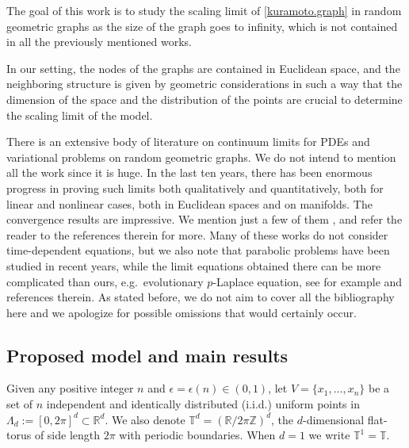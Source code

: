 \documentclass[a4paper,11pt]{amsart}
\newcommand{\red}[1]{{#1}}
\newcommand{\R}{\mathbb{R}}
\newcommand{\T}{\mathbb{T}}
\newcommand{\Z}{\mathbb{Z}}
\newcommand{\ep}{\epsilon}
\numberwithin{equation}{section}
\numberwithin{theorem}{section}
\theoremstyle{definition}
\begin{document}
The goal of this work is to study the scaling limit of \eqref{kuramoto.graph} in random geometric graphs as the size of the graph goes to infinity, which is not contained in all the previously mentioned works.

In our setting, the nodes of the graphs are contained in Euclidean space, and the neighboring structure is given by geometric considerations in such a way that the dimension of the space and the distribution of the points are crucial to determine the scaling limit of the model.

There is an extensive body of literature on continuum limits for PDEs and variational problems on random geometric graphs. We do not intend to mention all the work since it is huge. In the last ten years, there has been enormous progress in proving such limits both qualitatively and quantitatively, both for linear and nonlinear cases, both in Euclidean spaces and on manifolds. The convergence results are impressive. We mention just a few of them  \cite{thorpe2015gamma, trillos2016continuum, calder2019game, trillos2020error, armstrong2023quantitative, bungert2024ratio}, and refer the reader to the references therein for more. \red{Many of these works do not consider time-dependent equations, but we also note that parabolic problems have been studied in recent years, while the limit equations obtained there can be more complicated than ours, e.g.~evolutionary $p$-Laplace equation, see for example \cite{yuan2022continuum, esposito2021nonlocal, weihs2024discrete} and references therein. As stated before, we do not aim to cover all the bibliography here and we apologize for possible omissions that would certainly occur.}


\subsection{Proposed model and main results}\label{subsec:setting}

Given any positive integer $n$ and $\ep=\ep(n)\in(0,1)$, let $V=\{x_1,...,x_n\}$ be a set of $n$ independent and identically distributed (i.i.d.) uniform points in \red{$\Lambda_d:=[0,2\pi]^d\subset\R^d$. We also denote $\T^d=(\R/2\pi\Z)^d$, the $d$-dimensional flat-torus of side length $2\pi$ with periodic boundaries}. When $d=1$ we write $\T^1 = \mathbb T$. 
\end{document}
